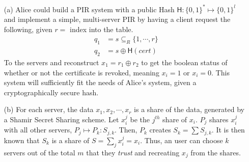 \documentclass[11pt]{article}
\begin{document}
\begin{itemize}
  \item[(a)] Alice could build a PIR system with a public Hash $\textsf{H}: \{0, 1\}^* 
    \mapsto \{0, 1\}^l$ and implement a simple, multi-server PIR by having a client request 
    the following, given $r = $ index into the table.
    \begin{align}
      q_1 &= s \subseteq_R \{1, \cdots , r\}  \nonumber \\
      q_2 &= s \oplus \textsf{H}(cert)  \nonumber
    \end{align}
    To the servers and reconstruct $x_1 = r_1 \oplus r_2$ to get the boolean status of 
    whether or not the certificate is revoked, meaning $x_i = 1$ or $x_i = 0$. This system
    will sufficiently fit the needs of Alice's system, given a cryptographically secure hash.
  \item[(b)] For each server, the data $x_1, x_2, \cdots, x_r$ is a share of the data, generated
    by a Shamir Secret Sharing scheme. Let $x_i^j$ be the $j^{th}$ share of $x_i$. $P_j$ shares
    $x_i^j$ with all other servers, $P_j \mapsto P_k: S_{j, k}$. Then, $P_k$ creates 
    $S_k = \sum S_{j, k}$. It is then known that $S_k$ is a share of $S = \sum_j x_i^j = x_i$. 
    Thus, an user can choose $k$ servers out of the total $m$ that they \textit{trust} and 
    recreating $x_j$ from the shares.
\end{itemize}
\end{document}
